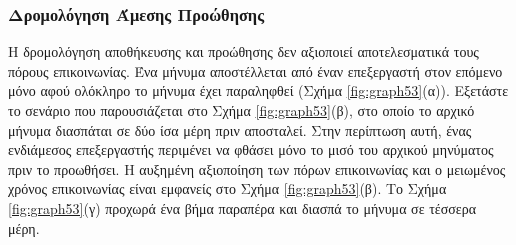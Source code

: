 \documentclass[12pt,a4paper]{article}
\begin{document}
\subsubsection{Δρομολόγηση Άμεσης Προώθησης}
Η δρομολόγηση αποθήκευσης και προώθησης δεν αξιοποιεί αποτελεσματικά τους 
πόρους επικοινωνίας. Ένα μήνυμα αποστέλλεται από έναν επεξεργαστή στον 
επόμενο μόνο αφού ολόκληρο το μήνυμα έχει παραληφθεί {(}Σχήμα \ref{fig:graph53}(α){)}. 
Εξετάστε το σενάριο που παρουσιάζεται στο Σχήμα \ref{fig:graph53}(β),
στο οποίο το αρχικό μήνυμα διασπάται σε δύο ίσα μέρη πριν αποσταλεί. Στην 
περίπτωση αυτή, ένας ενδιάμεσος επεξεργαστής περιμένει να φθάσει μόνο
το μισό του αρχικού μηνύματος πριν το προωθήσει. Η αυξημένη αξιοποίηση
των πόρων επικοινωνίας και ο μειωμένος χρόνος επικοινωνίας είναι εμφανείς
στο Σχήμα \ref{fig:graph53}(β). Το Σχήμα \ref{fig:graph53}(γ) προχωρά ένα 
βήμα παραπέρα και διασπά το μήνυμα σε τέσσερα μέρη.
\end{document}
